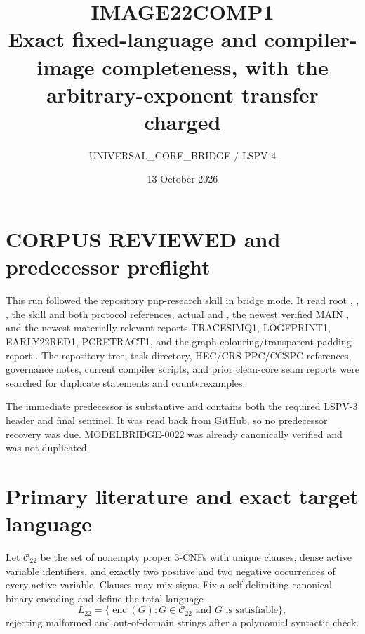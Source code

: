 \documentclass[11pt]{article}
\title{IMAGE22COMP1\\\large Exact fixed-language and compiler-image completeness, with the arbitrary-exponent transfer charged}
\author{UNIVERSAL\_CORE\_BRIDGE / LSPV-4}
\date{13 October 2026}
\newcommand{\Ctwo}{\mathcal C_{22}}
\newcommand{\Ltwo}{L_{22}}
\begin{document}
\maketitle

\begin{center}
\end{center}

\section{CORPUS REVIEWED and predecessor preflight}
This run followed the repository pnp-research skill in bridge mode.  It read
root , , , the skill and both
protocol references, actual  and , the newest
verified MAIN , and
the newest materially relevant reports TRACESIMQ1, LOGFPRINT1, EARLY22RED1,
PCRETRACT1, and the graph-colouring/transparent-padding report
.
The repository tree, task directory, HEC/CRS-PPC/CCSPC references, governance
notes, current compiler scripts, and prior clean-core seam reports were
searched for duplicate statements and counterexamples.

The immediate predecessor
is substantive and contains both the required LSPV-3 header and final
sentinel.  It was read back from GitHub, so no predecessor recovery was due.
MODELBRIDGE-0022 was already canonically verified and was not duplicated.

\section{Primary literature and exact target language}
Let $\Ctwo$ be the set of nonempty proper 3-CNFs with unique clauses, dense
active variable identifiers, and exactly two positive and two negative
occurrences of every active variable.  Clauses may mix signs.  Fix a
self-delimiting canonical binary encoding and define the total language
\[
 \Ltwo=\{\operatorname{enc}(G):G\in\Ctwo\text{ and }G\text{ is satisfiable}\},
 \tag{1}
\]
rejecting malformed and out-of-domain strings after a polynomial syntactic
check.
\end{document}
